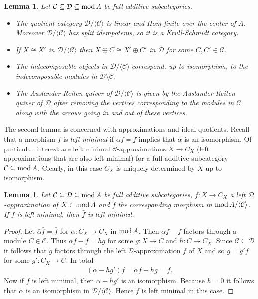 \documentclass[a4paper]{amsart}
\renewcommand{\mod}{\textnormal{mod}\,}
\numberwithin{equation}{section} \theoremstyle{plain}
\numberwithin{thm}{section}
\newtheorem{lem}[thm]{Lemma}
\begin{document}
\begin{lem} \label{L: folklore} Let $\mathcal{C}\subseteq \mathcal{D}\subseteq \mod A$ be full additive subcategories.
\begin{itemize}
    \item[(1)] The quotient category $\mathcal{D}/\langle \mathcal{C} \rangle$ is linear and Hom-finite over the center of $A$. Moreover $\mathcal{D}/\langle \mathcal{C} \rangle$ has split idempotents, so it is a Krull-Schmidt category.
    \item[(2)] If $X\cong X'$ in $\mathcal{D}/\langle \mathcal{C} \rangle$ then $X\oplus C \cong X' \oplus C'$ in $\mathcal{D}$ for some $C,C' \in \mathcal{C}$.
    \item[(3)] The indecomposable objects in $\mathcal{D}/\langle \mathcal{C} \rangle$ correspond, up to isomorphism, to the indecomposable modules in $\mathcal{D} \setminus \mathcal{C}$.
    \item[(4)] The Auslander-Reiten quiver of $\mathcal{D}/\langle \mathcal{C} \rangle$ is given by the Auslander-Reiten quiver of $\mathcal{D}$ after removing the vertices corresponding to the modules in $\mathcal{C}$ along with the arrows going in and out of these vertices.
\end{itemize}
\end{lem}

The second lemma is concerned with approximations and ideal quotients. Recall that a morphism $f$ is \emph{left minimal} if $\alpha f = f$ implies that $\alpha$ is an isomorphism. Of particular interest are left minimal $\mathcal{C}$-approximations $X\to C_X$ (left approximations that are also left minimal) for a full additive subcategory $\mathcal{C} \subseteq \mod A$. Clearly, in this case $C_X$ is uniquely determined by $X$ up to isomorphism.

\begin{lem}\label{L: app} Let $\mathcal{C} \subseteq \mathcal{D} \subseteq \mod A$ be full additive subcategories, $f\colon X\to C_X$ a left $\mathcal{D}$-approximation of $X\in \mod A$ and $\bar{f}$ the corresponding morphism in $\mod A/\langle \mathcal{C} \rangle$. If $f$ is left minimal, then $\bar{f}$ is left minimal.
\end{lem}
\begin{proof} Let $\bar{\alpha} \bar{f} = \bar{f}$ for $\alpha \colon C_X \to C_X$ in $\mod A$. Then $\alpha f -f$ factors through a module $C\in \mathcal{C}$. Thus $\alpha f - f = hg$ for some $g\colon X \to C$ and $h\colon C \to C_X$. Since $\mathcal{C}\subseteq \mathcal{D}$ it follows that $g$ factors through the left $\mathcal{D}$-approximation $f$ of $X$ and so $g = g'f$ for some $g' \colon C_X \to C$. In total 
\begin{align*}
    (\alpha - hg') f = \alpha f - hg = f.
\end{align*}
Now if $f$ is left minimal, then $\alpha - hg'$ is an isomorphism. Because $\bar{h} = 0$ it follows that $\bar{\alpha}$ is an isomorphism in $\mathcal{D}/ \langle \mathcal{C}\rangle$. Hence $\bar{f}$ is left minimal in this case.
\end{proof}
\end{document}
